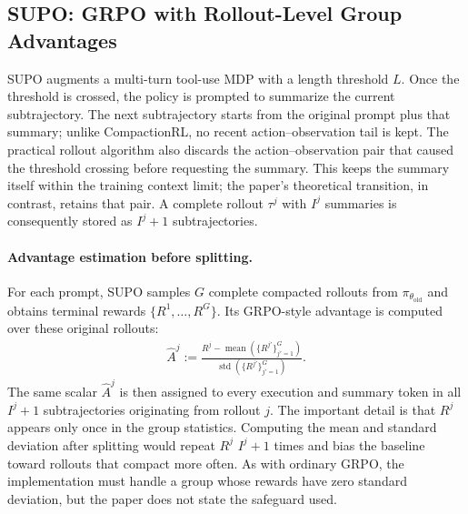 \subsection{SUPO: GRPO with Rollout-Level Group Advantages}

SUPO augments a multi-turn tool-use MDP with a length threshold $L$.  Once the
threshold is crossed, the policy is prompted to summarize the current
subtrajectory.  The next subtrajectory starts from the original prompt plus
that summary; unlike CompactionRL, no recent action--observation tail is kept.
The practical rollout algorithm also discards the action--observation pair
that caused the threshold crossing before requesting the summary.  This keeps
the summary itself within the training context limit; the paper's theoretical
transition, in contrast, retains that pair.  A complete rollout
$\tau^j$ with $I^j$ summaries is consequently stored as $I^j+1$
subtrajectories.

\paragraph{Advantage estimation before splitting.}
For each prompt, SUPO samples $G$ complete compacted rollouts from
$\pi_{\theta_{\mathrm{old}}}$ and obtains terminal rewards
$\{R^1,\ldots,R^G\}$.  Its GRPO-style advantage is computed over these
original rollouts:
\begin{align}
    \widehat A^j
    :=
    \frac{
        R^j-\operatorname{mean}(\{R^{j'}\}_{j'=1}^{G})
    }{
        \operatorname{std}(\{R^{j'}\}_{j'=1}^{G})
    }.
    \label{eq:supo.advantage}
\end{align}
The same scalar $\widehat A^j$ is then assigned to every execution and summary
token in all $I^j+1$ subtrajectories originating from rollout $j$.  The
important detail is that $R^j$ appears only once in the group statistics.
Computing the mean and standard deviation after splitting would repeat $R^j$
$I^j+1$ times and bias the baseline toward rollouts that compact more often.
As with ordinary GRPO, the implementation must handle a group whose rewards
have zero standard deviation, but the paper does not state the safeguard used.

